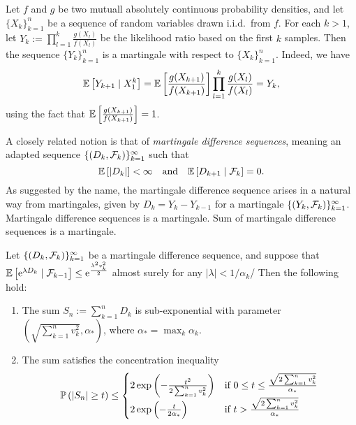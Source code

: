 \begin{example}
	Let \(f\) and \(g\) be two mutuall absolutely continuous probability densities, and let \(\{X_{k}\}_{k=1}^{n}\) be a sequence of random variables drawn i.i.d.\ from \(f\). For each \(k>1\), let \(Y_{k}:=\prod_{l=1}^{k}\frac{g(X_{l})}{f(X_{l})}\) be the likelihood ratio based on the first \(k\) samples. Then the sequence \(\{Y_{k}\}_{k=1}^{n}\) is a martingale with respect to \(\{X_{k}\}_{k=1}^{n}\). Indeed, we have
	\begin{equation*}
		{\mathbb E}\left[Y_{k+1}\mid X_{1}^{k}\right]={\mathbb E}\left[\frac{g(X_{k+1})}{f(X_{k+1})}\right]\prod_{l=1}^{k}\frac{g(X_{l})}{f(X_{l})}=Y_{k},
	\end{equation*}
	using the fact that \({\mathbb E}\left[\frac{g(X_{k+1})}{f(X_{k+1})}\right]=1\).
\end{example}

A closely related notion is that of \textit{martingale difference sequences}, meaning an adapted sequence \(\{(D_{k},{\mathcal F}_{k})\}_{k=1}^{\infty}\) such that
\begin{equation*}
	{\mathbb E}\left[\left|D_{k}\right|\right]<\infty\quad\text{and}\quad{\mathbb E}\left[D_{k+1}\mid{\mathcal F}_{k}\right]=0.
\end{equation*}
As suggested by the name, the martingale difference sequence arises in a natural way from martingales, given by \(D_{k}=Y_{k}-Y_{k-1}\) for a martingale \(\{(Y_{k},{\mathcal F}_{k})\}_{k=1}^{\infty}\). 
Martingale difference sequences is a martingale.
Sum of martingale difference sequences is a martingale.

\begin{theorem}
	Let \(\{(D_{k},{\mathcal F}_{k})\}_{k=1}^{\infty}\) be a martingale difference sequence, and suppose that \({\mathbb E}\left[\mathrm{e}^{\lambda D_{k}}\mid {\mathcal F}_{k-1}\right]\leq\mathrm{e}^{\frac{\lambda^{2}v_{k}^{2}}{2}}\) almost surely for any \(|\lambda|<1/\alpha_{k}\)/ Then the following hold:
	\begin{enumerate}
		\item The sum \(S_{n}:=\sum_{k=1}^{n}D_{k}\) is sub-exponential with parameter \(\left(\sqrt{\sum_{k=1}^{n}v_{k}^{2}},\alpha_{*}\right)\), where \(\alpha_{*}=\max_{k}\alpha_{k}\).
		\item The sum satisfies the concentration inequality
		\begin{equation*}
			{\mathbb P}\left(\left|S_{n}\right|\geq t\right)\leq\begin{cases}
				2\exp\left(-\frac{t^{2}}{2\sum_{k=1}^{n}v_{k}^{2}}\right) & \text{if }0\leq t\leq\frac{\sqrt{2\sum_{k=1}^{n}v_{k}^{2}}}{\alpha_{*}} \\
				2\exp\left(-\frac{t}{2\alpha_{*}}\right) & \text{if }t>\frac{\sqrt{2\sum_{k=1}^{n}v_{k}^{2}}}{\alpha_{*}}
			\end{cases}
		\end{equation*}
	\end{enumerate}
\end{theorem}

